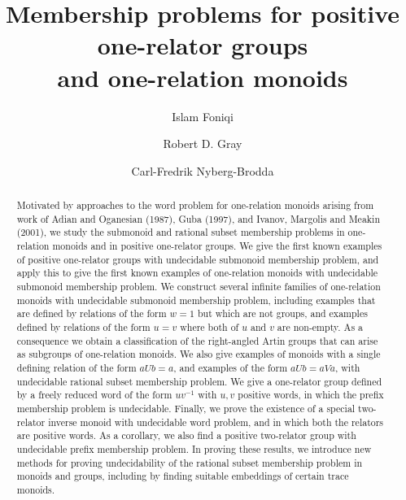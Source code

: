 \documentclass{amsart}
\title[Membership problems for one-relator groups and monoids]{Membership problems for positive one-relator groups \\ and one-relation monoids}
\author{Islam Foniqi}
\author{Robert D. Gray }
\author{Carl-Fredrik Nyberg-Brodda}
\theoremstyle{plain}
\theoremstyle{definition}
\begin{document}
	
\begin{abstract}
Motivated by approaches to the word problem for one-relation monoids arising from work of Adian and Oganesian (1987), Guba (1997), and Ivanov, Margolis and Meakin (2001), 
we study the submonoid and rational subset membership problems in one-relation monoids and in positive one-relator groups. We give the first known examples of positive one-relator groups with undecidable submonoid membership problem, and apply this to give the first known examples of one-relation monoids with undecidable submonoid membership problem. We construct several infinite families of one-relation monoids with undecidable submonoid membership problem, including examples that are defined by relations of the form $w=1$ but which are not groups, and examples defined by relations of the form $u=v$ where both of $u$ and $v$ are non-empty. As a consequence we obtain a classification of the right-angled Artin groups that can arise as subgroups of one-relation monoids.  We also give examples of monoids with a single defining relation of the form $aUb = a$, and examples of the form $aUb=aVa$, with undecidable rational subset membership problem. 
We give a one-relator group defined by a freely reduced word of the form $uv^{-1}$ with $u, v$ positive words, in which the prefix membership problem is undecidable. Finally, we prove the existence of a special two-relator inverse monoid with undecidable word problem, and in which both the relators are positive words. As a corollary, we also find a positive two-relator group with undecidable prefix membership problem. In proving these results, we introduce new methods for proving undecidability of the rational subset membership problem in monoids and groups, including by finding suitable embeddings of certain trace monoids.
\end{abstract}
\maketitle






\vspace{-6mm}
\end{document}
